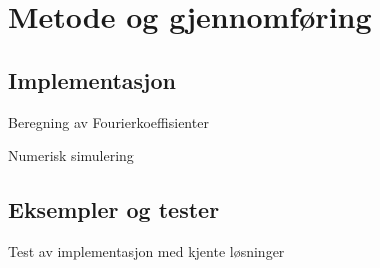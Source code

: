 \section{Metode og gjennomføring}

\subsection{Implementasjon}

Beregning av Fourierkoeffisienter

Numerisk simulering

\subsection{Eksempler og tester }
Test av implementasjon med kjente løsninger
